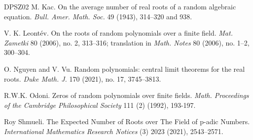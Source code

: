 \documentclass[12pt]{amsart}
\theoremstyle{definition}
\begin{document}
\begin{thebibliography}{DPSZ02}
M. Kac. 
On the average number of real roots of a random algebraic equation. 
{\em Bull. Amer. Math. Soc.} 49 (1943), 314--320 and 938.

V. K. Leont\'ev. 
On the roots of random polynomials over a finite field. 
{\em Mat. Zametki} 80 (2006), no. 2, 313--316; translation in
{\em Math. Notes} 80 (2006), no. 1--2, 300--304.

O. Nguyen and V. Vu.
Random polynomials: central limit theorems for the real roots.
{\em Duke Math. J.} 170 (2021), no. 17, 3745--3813.

R.W.K. Odoni.
Zeros of random polynomials over finite fields.
{\em Math. Proceedings of the Cambridge Philosophical Society} 111 (2) (1992), 193-197.

Roy Shmueli.
The Expected Number of Roots over The Field of p-adic Numbers.
{\em International Mathematics Research Notices} (3) 2023 (2021), 2543--2571.

\end{thebibliography}
\end{document}

